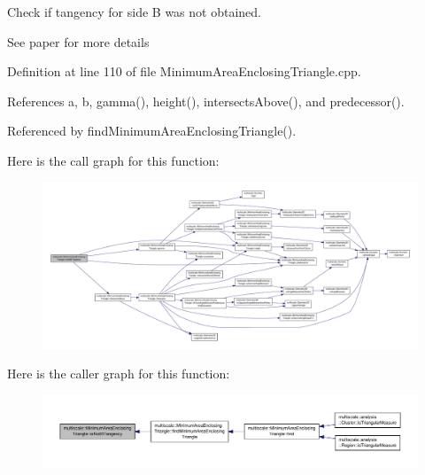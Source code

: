Check if tangency for side B was not obtained. 

See paper for more details 

Definition at line 110 of file Minimum\-Area\-Enclosing\-Triangle.\-cpp.



References a, b, gamma(), height(), intersects\-Above(), and predecessor().



Referenced by find\-Minimum\-Area\-Enclosing\-Triangle().



Here is the call graph for this function\-:\nopagebreak
\begin{figure}[H]
\begin{center}
\leavevmode
\includegraphics[width=350pt]{classmultiscale_1_1MinimumAreaEnclosingTriangle_ab8fcbbabc20d96ebaf6edeeaf0d38e63_cgraph}
\end{center}
\end{figure}




Here is the caller graph for this function\-:\nopagebreak
\begin{figure}[H]
\begin{center}
\leavevmode
\includegraphics[width=350pt]{classmultiscale_1_1MinimumAreaEnclosingTriangle_ab8fcbbabc20d96ebaf6edeeaf0d38e63_icgraph}
\end{center}
\end{figure}


